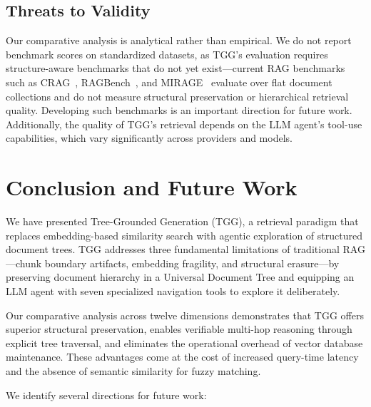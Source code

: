 \documentclass[conference]{IEEEtran}
\begin{document}
\subsection{Threats to Validity}

Our comparative analysis is analytical rather than empirical. We do not report benchmark scores on standardized datasets, as TGG's evaluation requires structure-aware benchmarks that do not yet exist---current RAG benchmarks such as CRAG~\cite{yang2024crag}, RAGBench~\cite{friel2024ragbench}, and MIRAGE~\cite{park2025mirage} evaluate over flat document collections and do not measure structural preservation or hierarchical retrieval quality. Developing such benchmarks is an important direction for future work. Additionally, the quality of TGG's retrieval depends on the LLM agent's tool-use capabilities, which vary significantly across providers and models.

\section{Conclusion and Future Work}

We have presented Tree-Grounded Generation (TGG), a retrieval paradigm that replaces embedding-based similarity search with agentic exploration of structured document trees. TGG addresses three fundamental limitations of traditional RAG---chunk boundary artifacts, embedding fragility, and structural erasure---by preserving document hierarchy in a Universal Document Tree and equipping an LLM agent with seven specialized navigation tools to explore it deliberately.

Our comparative analysis across twelve dimensions demonstrates that TGG offers superior structural preservation, enables verifiable multi-hop reasoning through explicit tree traversal, and eliminates the operational overhead of vector database maintenance. These advantages come at the cost of increased query-time latency and the absence of semantic similarity for fuzzy matching.

We identify several directions for future work:
\end{document}
